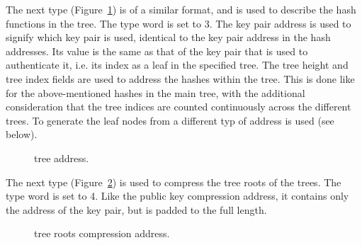    The next type (Figure~\ref{fig:adrs:forstree}) is of a similar format, and is used to describe the hash functions
   in the \fors tree.  The type word is set to 3.  The key pair address is used to signify which \fors key pair is used,
   identical to the key pair address in the \wotsp hash addresses.
   Its value is the same as that of the \wotsp key pair that is used to authenticate it,
   i.e. its index as a leaf in the specified tree.
   The tree height and tree index fields are used to address the hashes within the \fors tree.
   This is done like for the above-mentioned hashes in the main tree,
   with the additional consideration that the tree indices are counted
   continuously across the different \fors trees.
   To generate the leaf nodes from \sseed a different typ of address is used (see below).

\begin{figure}[h]
  \centering
  \caption{\fors tree address.}
  \label{fig:adrs:forstree}
\end{figure}


   The next type (Figure~\ref{fig:adrs:forspk}) is used to compress the tree roots of the \fors trees.  The type word is set to 4.
   Like the \wotsp public key compression address, it contains only the address
   of the \fors key pair, but is padded to the full length.

\begin{figure}[h]
  \centering
  \caption{\fors tree roots compression address.}
  \label{fig:adrs:forspk}
\end{figure}


